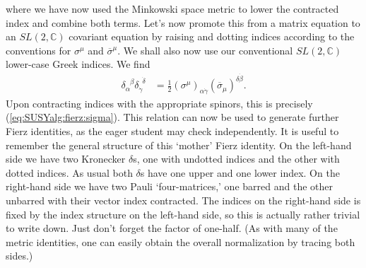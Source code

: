 \documentclass[12pt]{article}
\numberwithin{equation}{section}    %
\begin{document}
where we have now used the Minkowski space metric to lower the contracted index and combine both terms. Let's now promote this from a matrix equation to an  $SL(2,\mathbb C)$ covariant equation by raising and dotting indices according to the conventions for $\sigma^\mu$ and $\overline\sigma^\mu$. We shall also now use our conventional $SL(2,\mathbb C)$ lower-case Greek indices. We find
\begin{align}
	\delta_\alpha^{\phantom\alpha\beta}\delta_{\dot\gamma}^{\phantom\gamma\dot\delta} &= \frac 12 (\sigma^\mu)_{\alpha\dot\gamma}(\overline\sigma_\mu)^{\delta\dot\beta}.\label{eq:SUSYalg:sigma:fierz}
\end{align}
Upon contracting indices with the appropriate spinors, this is precisely  (\ref{eq:SUSYalg:fierz:sigma}). This relation can now be used to generate further Fierz identities, as the eager student may check independently. It is useful to remember the general structure of this `mother' Fierz identity. On the left-hand side we have two Kronecker $\delta$s, one with undotted indices and the other with dotted indices. As usual both $\delta$s have one upper and one lower index. On the right-hand side we have two Pauli `four-matrices,' one barred and the other unbarred with their vector index contracted. The indices on the right-hand side is fixed by the index structure on the left-hand side, so this is actually rather trivial to write down. Just don't forget the factor of one-half. (As with many of the metric identities, one can easily obtain the overall normalization by tracing both sides.)


\end{document}
